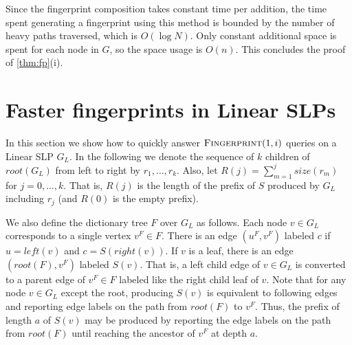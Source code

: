 \documentclass[11pt]{article}
\newcommand{\fingerprintq}{\ensuremath{\textsc{Fingerprint}}}
\newcommand{\size}{\ensuremath{\mathit{size}}}
\newcommand{\rootnode}{\ensuremath{\mathit{root}}}
\newcommand{\lchild}{\ensuremath{\mathit{left}}}
\newcommand{\rchild}{\ensuremath{\mathit{right}}}
\newcommand{\slp}{\ensuremath{G} }
\newcommand{\lslp}{\ensuremath{G_L} }
\begin{document}
Since the fingerprint composition takes constant time per addition, the time spent generating a fingerprint using this method is bounded by the number of heavy paths traversed, which is $O(\log N)$. Only constant additional space is spent for each node in $\slp$, so the space usage is $O(n)$. This concludes the proof of \autoref{thm:fp}(i).

\section{Faster fingerprints in Linear SLPs}
In this section we show how to quickly answer $\fingerprintq(1, i)$ queries on a Linear SLP $\lslp$. In the following we denote the sequence of $k$ children of $\rootnode(\lslp)$ from left to right by $r_1, \ldots, r_k$. Also, let $R(j) = \sum_{m=1}^j \size(r_m)$ for $j = 0, \ldots, k$. That is, $R(j)$ is the length of the prefix of $S$ produced by $\lslp$ including $r_j$ (and $R(0)$ is the empty prefix).

We also define the dictionary tree $F$ over $\lslp$ as follows. Each node $v \in \lslp$ corresponds to a single vertex $v^F \in F$. There is an edge $(u^F, v^F)$ labeled $c$ if $u = \lchild(v)$ and $c = S(\rchild(v))$. If $v$ is a leaf, there is an edge $(\rootnode(F), v^F)$ labeled $S(v)$. That is, a left child edge of $v \in \lslp$ is converted to a parent edge of $v^F \in F$ labeled like the right child leaf of $v$. Note that for any node $v \in \lslp$ except the root, producing $S(v)$ is equivalent to following edges and reporting edge labels on the path from $\rootnode(F)$ to $v^F$. Thus, the prefix of length $a$ of $S(v)$ may be produced by reporting the edge labels on the path from $\rootnode(F)$ until reaching the ancestor of $v^F$ at depth $a$.
\end{document}

